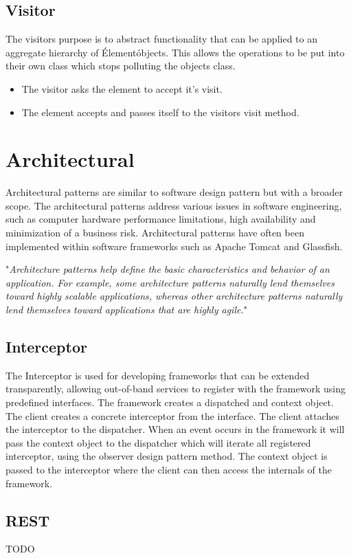 \subsection{Visitor}
The visitors purpose is to abstract functionality that can be applied to an aggregate hierarchy of \'Element\' objects. \cite{sourcemaking} This allows the operations to be put into their own class which stops polluting the objects class.
\begin{itemize}
	\item The visitor asks the element to accept it's visit.
	\item The element accepts and passes itself to the visitors visit method.
\end{itemize}

\section{Architectural}
Architectural patterns are similar to software design pattern but with a broader scope. The architectural patterns address various issues in software engineering, such as computer hardware performance limitations, high availability and minimization of a business risk. Architectural patterns have often been implemented within software frameworks such as Apache Tomcat and Glassfish.

"\textit{Architecture patterns help define the basic characteristics and behavior of an application. For example, some architecture patterns naturally lend themselves toward highly scalable applications,
whereas other architecture patterns naturally lend themselves toward applications that are highly agile.}" \citep{patterns}

\subsection{Interceptor}
The Interceptor is used for developing frameworks that can be extended transparently, allowing out-of-band services to register with the framework using predefined interfaces. The framework creates  a dispatched and context object. The client creates a concrete interceptor from the interface. The client attaches the interceptor to the dispatcher. When an event occurs in the framework it will pass the context object to the dispatcher which will iterate all registered interceptor, using the observer design pattern method. The context object is passed to the interceptor where the client can then access the internals of the framework.

\subsection{REST}
TODO
